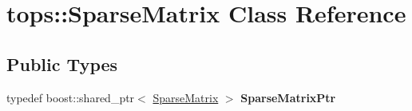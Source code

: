 \hypertarget{classtops_1_1SparseMatrix}{}\section{tops\+:\+:Sparse\+Matrix Class Reference}
\label{classtops_1_1SparseMatrix}
\subsection*{Public Types}
\begin{DoxyCompactItemize}
\item 
\mbox{\label{classtops_1_1SparseMatrix_abfa053dd3aa1f34e9ef0c048d5e4dfca}} 
typedef boost\+::shared\+\_\+ptr$<$ \hyperlink{classtops_1_1SparseMatrix}{Sparse\+Matrix} $>$ {\bfseries Sparse\+Matrix\+Ptr}
\end{DoxyCompactItemize}
